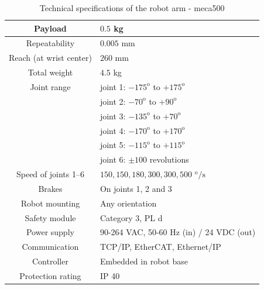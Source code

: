 \begin{table}[htbp]
\centering
\tabcolsep=18pt
\arrayrulewidth=1pt
\caption{Technical specifications of the robot arm - meca500}
\label{tab:meca_specification}
\par
\begin{tabular}{|>{\columncolor{lightgray!20}}c|l|} 
\hline
Payload						&$0.5$ kg					\\	\hline
Repeatability				&$0.005$ mm					\\	\hline
Reach (at wrist center)		&$260$ mm	\\ \hline
Total weight				&$4.5$ kg						\\	\hline
\multirow{6}{*}{}Joint range&joint 1: $-175^\text{o}$ to $+175^\text{o}$				\\	
							&joint 2: $-70^\text{o}$ to $+90^\text{o}$				\\	
							&joint 3: $-135^\text{o}$ to $+70^\text{o}$				\\	
							&joint 4: $-170^\text{o}$ to $+170^\text{o}$				\\	
							&joint 5: $-115^\text{o}$ to $+115^\text{o}$				\\	
							&joint 6: $\pm 100$ revolutions				\\	\hline
Speed of joints 1–6 &${150, 150, 180, 300, 300, 500}$ $^\text{o}\text{/s}$				\\	\hline
Brakes 				&On joints 1, 2 and 3				\\	\hline
Robot mounting 		&Any orientation				\\	\hline
Safety module		&Category 3, PL d				\\	\hline
Power supply 		&90-264 VAC, 50-60 Hz (in) / 24 VDC (out)				\\	\hline
Communication 		&TCP/IP, EtherCAT, Ethernet/IP				\\	\hline
Controller 			&Embedded in robot base				\\	\hline
Protection rating 	&IP 40								\\	
\hline
\end{tabular}
\end{table}

